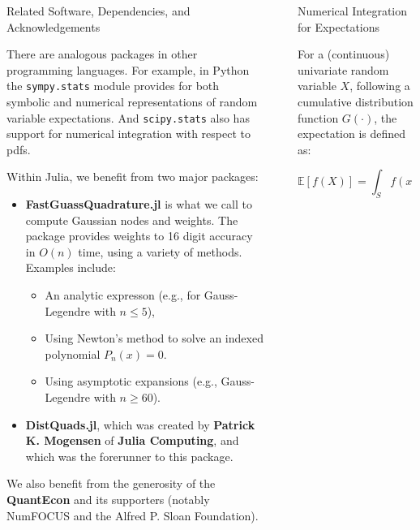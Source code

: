 \documentclass[final]{beamer}
\newlength{\sepwidth}
\newlength{\colwidth}
\newcommand{\separatorcolumn}{\begin{column}{\sepwidth}\end{column}}
\begin{document}
\begin{frame}[fragile]
\begin{columns}[t]
\begin{column}{\colwidth}
  \begin{block}{Related Software, Dependencies, and Acknowledgements}

  There are analogous packages in other programming languages. For example, in Python the \texttt{sympy.stats} module provides for both symbolic and numerical representations of random variable expectations. And \texttt{scipy.stats} also has support for numerical integration with respect to pdfs.

  Within Julia, we benefit from two major packages: 

  \begin{itemize}
    \item \textbf{FastGuassQuadrature.jl} \cite{fastquad} is what we call to compute Gaussian nodes and weights. The package provides weights to 16 digit accuracy in $O(n)$ time, using a variety of methods. Examples include:
    
    \begin{itemize}
      \item An analytic expresson (e.g., for Gauss-Legendre with $n \leq 5$), 
      \item Using Newton's method to solve an indexed polynomial $P_n(x) = 0$.
      \item Using asymptotic expansions (e.g., Gauss-Legendre with $n \geq 60$).
    \end{itemize}

    \item \textbf{DistQuads.jl}, which was created by \textbf{Patrick K. Mogensen} of \textbf{Julia Computing}, and which was the forerunner to this package.
  \end{itemize}

  We also benefit from the generosity of the \textbf{QuantEcon} and its supporters (notably NumFOCUS and the Alfred P. Sloan Foundation).
  \end{block}

\end{column}

\separatorcolumn

\begin{column}{\colwidth}

  \begin{block}{Numerical Integration for Expectations}

    For a (continuous) univariate random variable $X$, following a cumulative distribution function $G(\cdot)$, the expectation is defined as:

    \begin{equation}
      \mathbb{E}[f(X)] = \int_{S}f(x) dG(x)
    \end{equation}


\end{block}
\end{column}
\end{columns}
\end{frame}
\end{document}
